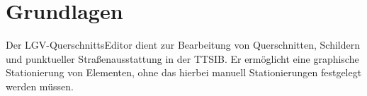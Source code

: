 \documentclass[a4paper,11pt,bibliography=totoc, listof=totoc,titlepage]{scrartcl}
\renewcommand{\arraystretch}{1.5}
\begin{document}


\providecommand{\citeTwo}[4]{\citep[{\citealp[#1]{#2};}][#3]{#4}} 
\providecommand{\citeThree}[6]{\citep[{\citealp[#1]{#2}; \citealp[#3]{#4};}][#5]{#6}} 
\providecommand{\citeFour}[8]{\citep[{\citealp[#1]{#2}; \citealp[#3]{#4}; \citealp[#5]{#6};}][#7]{#8}}

\newpage

\tableofcontents
\newpage

\setcounter{page}{1} 

\section{Grundlagen}
Der LGV-QuerschnittsEditor dient zur Bearbeitung von Querschnitten, Schildern und punktueller Straßenausstattung in der TTSIB. Er ermöglicht eine graphische Stationierung von Elementen, ohne das hierbei manuell Stationierungen festgelegt werden müssen.
\end{document}
